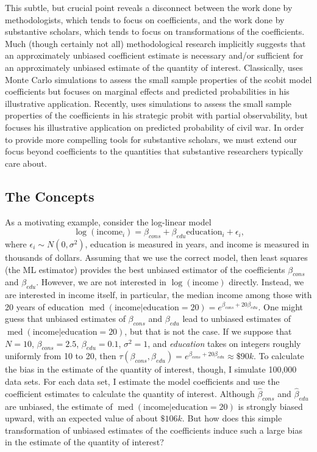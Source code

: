 \documentclass[12pt]{article}
\DeclareMathOperator{\med}{med}
\begin{document}
This subtle, but crucial point reveals a disconnect between the work done by methodologists, which tends to focus on coefficients, and the work done by substantive scholars, which tends to focus on transformations of the coefficients. 
Much (though certainly not all) methodological research implicitly suggests that an approximately unbiased coefficient estimate is necessary and/or sufficient for an approximately unbiased estimate of the quantity of interest. 
Classically, \cite{Nagler1994} uses Monte Carlo simulations to assess the small sample properties of the scobit model coefficients but focuses on marginal effects and predicted probabilities in his illustrative application. 
Recently, \cite{Nieman2015} uses simulations to assess the small sample properties of the coefficients in his strategic probit with partial observability, but focuses his illustrative application on predicted probability of civil war. 
In order to provide more compelling tools for substantive scholars, we must extend our focus beyond coefficients to the quantities that substantive researchers typically care about.

\subsection*{The Concepts}

As a motivating example, consider the log-linear model 
\begin{equation}
\log (\text{income}_i) = \beta_{cons} + \beta_{edu} \text{education}_i + \epsilon_i \text{,}\nonumber
\end{equation}
where $\epsilon_i \sim N(0, \sigma^2)$, education is measured in years, and income is measured in thousands of dollars. 
Assuming that we use the correct model, then least squares (the ML estimator) provides the best unbiased estimator of the coefficients $\beta_{cons}$ and $\beta_{edu}$. 
However, we are not interested in $\log(\text{income})$ directly. Instead, we are interested in income itself, in particular, the median income among those with 20 years of education $\med(\text{income} | \text{education} = 20) = e^{\beta_{cons} + 20\beta_{edu}}$. 
One might guess that unbiased estimates of $\beta_{cons}$ and $\beta_{edu}$ lead to unbiased estimates of $\med(\text{income} | \text{education} = 20)$, but that is not the case. 
If we suppose that $N = 10$, $\beta_{cons} = 2.5$, $\beta_{edu} = 0.1$, $\sigma^2 = 1$, and \textit{education} takes on integers roughly uniformly from 10 to 20, then $\tau(\beta_{cons}, \beta_{edu}) = e^{\beta_{cons} + 20\beta_{edu}} \approx \$90k$. 
To calculate the bias in the estimate of the quantity of interest, though, I simulate 100,000 data sets.
For each data set, I estimate the model coefficients and use the coefficient estimates to calculate the quantity of interest. 
Although $\hat{\beta}_{cons}$ and $\hat{\beta}_{edu}$ are unbiased, the estimate of $\med(\text{income} | \text{education} = 20)$ is strongly biased upward, with an expected value of about $\$106k$.
But how does this simple transformation of unbiased estimates of the coefficients induce such a large bias in the estimate of the quantity of interest?
\end{document}
